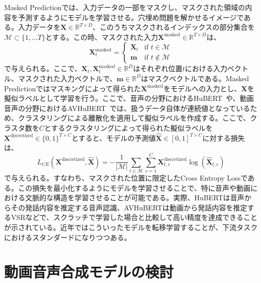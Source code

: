 \documentclass[12pt]{jarticle}
\numberwithin{equation}{section}    %
\numberwithin{figure}{section}      %
\numberwithin{table}{section}      %
\begin{document}
Masked Predictionでは、入力データの一部をマスクし、マスクされた領域の内容を予測するようにモデルを学習させる。穴埋め問題を解かせるイメージである。入力データを$\bm{X} \in \mathbb{R}^{T \times D}$、このうちマスクされるインデックスの部分集合を$\mathcal{M} \subset \{ 1, \ldots T \}$とする。この時、マスクされた入力$\bm{X}^{\text{masked}} \in \mathbb{R}^{T \times D}$は、
\begin{equation}
    \bm{X}^{\text{masked}}_{t} =
    \begin{cases}
        \bm{X}_{t} & \text{if $t \in \mathcal{M}$}    \\
        \bm{m}     & \text{if $t \notin \mathcal{M}$}
    \end{cases}
\end{equation}
で与えられる。ここで、$\bm{X}_{t}, \bm{X}^{\text{masked}}_{t} \in \mathbb{R}^{D}$はそれぞれ位置$t$における入力ベクトル、マスクされた入力ベクトルで、$\bm{m} \in \mathbb{R}^{D}$はマスクベクトルである。Masked Predictionではマスキングによって得られた$\bm{X}^{\text{masked}}$をモデルへの入力とし、$\bm{X}$を擬似ラベルとして学習を行う。ここで、音声の分野におけるHuBERT~\cite{hsu2021hubert}や、動画音声の分野におけるAVHuBERT~\cite{shi2022learning}では、扱うデータ自体が連続値となっているため、クラスタリングによる離散化を適用して擬似ラベルを作成する。ここで、クラスタ数を$C$とするクラスタリングによって得られた擬似ラベルを$\bm{X}^{\text{discretized}} \in \{0, 1\}^{T \times C}$とすると、モデルの予測値$\hat{\bm{X}} \in [0, 1]^{T \times C}$に対する損失は、
\begin{equation}
    L_{CE}(\bm{X}^{\text{discretized}}, \hat{\bm{X}}) =
    - \frac{1}{|\mathcal{M}|} \sum_{t \in \mathcal{M}} \sum_{c = 1}^{C} \bm{X}^{\text{discretized}}_{t, c} \log (\hat{\bm{X}}_{t, c})
\end{equation}
で与えられる。すなわち、マスクされた位置に限定したCross Entropy Lossである。この損失を最小化するようにモデルを学習させることで、特に音声や動画における文脈的な構造を学習させることが可能である。実際、HuBERTは音声からその発話内容を推定する音声認識、AVHuBERTは動画から発話内容を推定するVSRなどで、スクラッチで学習した場合と比較して高い精度を達成できることが示されている。近年ではこういったモデルを転移学習することが、下流タスクにおけるスタンダードになりつつある。

\clearpage

\section{動画音声合成モデルの検討}
\end{document}
